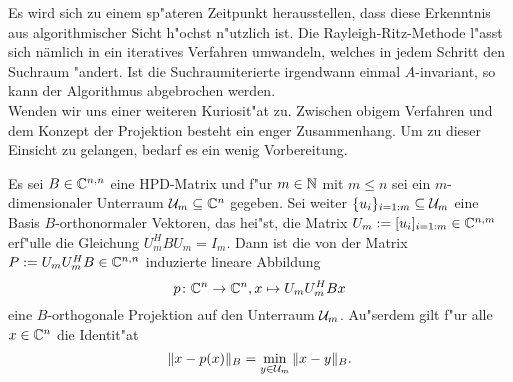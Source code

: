 Es wird sich zu einem sp"ateren Zeitpunkt herausstellen, dass diese Erkenntnis aus algorithmischer Sicht h"ochst n"utzlich ist.
Die Rayleigh-Ritz-Methode l"asst sich nämlich in ein iteratives Verfahren umwandeln, welches in jedem Schritt den Suchraum "andert. Ist die Suchraumiterierte irgendwann einmal $A$-invariant, so kann der Algorithmus abgebrochen werden.\\

Wenden wir uns einer weiteren Kuriosit"at zu. Zwischen obigem Verfahren und dem Konzept der Projektion besteht ein enger Zusammenhang.
Um zu dieser Einsicht zu gelangen, bedarf es ein wenig
Vorbereitung.
\begin{thm}\label{thm:projektor}
Es sei $B\in\mathbb{C}^{n,n}$ eine HPD-Matrix und f"ur $m\in\mathbb{N}$ mit $m\le n$ sei
ein $m$-dimensionaler Unterraum $\mathcal{U}_m \subseteq \mathbb{C}^n$ gegeben. Sei weiter $\{u_i\}_{i=1:m}\subseteq\mathcal{U}_m$ eine
Basis $B$-orthonormaler Vektoren, das hei"st, die Matrix $U_m := [u_i]_{i=1:m}
\in\mathbb{C}^{n,m}$ erf"ulle die Gleichung $U_m^H B U_m = I_m$. Dann ist die von der Matrix
 $P := U_m U_m^H B \in \mathbb{C}^{n,n}$ induzierte lineare Abbildung
\[
p \colon \mathbb{C}^n \to \mathbb{C}^n, x\mapsto U_m U_m^H Bx
\]
eine $B$-orthogonale Projektion auf den Unterraum $\mathcal{U}_m$. Au"serdem gilt
f"ur alle $x\in\mathbb{C}^n$ die Identit"at
\[
\|x-p(x)\|_B = \min_{y\in\mathcal{U}_m} \|x - y\|_B.
\]
\end{thm}

